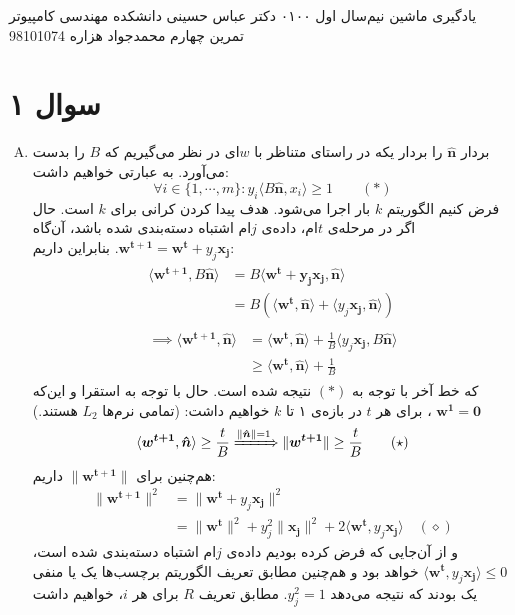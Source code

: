 \documentclass[a4paper, 12pt]{article}
\begin{document}
\handout
{یادگیری ماشین}
{نیم‌سال اول ۰۱\lr{-}۰۰}
{دکتر عباس حسینی}
{دانشکده مهندسی کامپیوتر}
{تمرین چهارم}
{محمد‌جواد هزاره}
{98101074}
\noindent
\\ [-6em]
\section*{سوال ۱}
\begin{enumerate}[A)]
	\item
	بردار $\bm{\hat{n}}$ را بردار یکه در راستای متناظر با $w$ای در نظر می‌گیریم که $B$ را بدست می‌آورد. به عبارتی خواهیم داشت:
	\[
	\forall i \in \{1, \cdots, m\}: y_i\langle B\bm{\hat{n}}, x_i\rangle \ge 1 \qquad (\ast)
	\]
	فرض کنیم الگوریتم $k$ بار اجرا می‌شود. هدف پیدا کردن کرانی برای $k$ است. حال اگر در مرحله‌ی $t$ام، داده‌ی $j$ام اشتباه دسته‌بندی شده باشد، آن‌گاه
	$\bm{w^{t+1}} = \bm{w^{t}} + y_j\bm{x_j}$.
	بنابراین داریم:
	\[
	\begin{aligned}
	\begin{aligned}
		\langle\bm{w^{t+1}}, B\bm{\hat{n}}\rangle &= B \langle\bm{w^t + y_j\bm{x_j}}, \bm{\hat{n}}\rangle \\
			&= B \left(\langle\bm{w^t}, \bm{\hat{n}}\rangle + \langle y_j\bm{x_j}, \bm{\hat{n}}\rangle\right)
	\end{aligned} \\[1.5em]
	\begin{aligned}
		\implies\langle\bm{w^{t+1}}, \bm{\hat{n}} \rangle &= \langle\bm{w^t}, \bm{\hat{n}}\rangle + \frac{1}{B} \langle y_j\bm{x_j}, B\bm{\hat{n}}\rangle \\
		&\ge \langle\bm{w^t}, \bm{\hat{n}}\rangle + \frac{1}{B}
	\end{aligned}
	\end{aligned}
	\]
	که خط آخر با توجه به $(\ast)$ نتیجه شده است. حال با توجه به استقرا و این‌که 
	$\bm{w^1} = \bm{0}$
	، برای هر $t$ در بازه‌ی ۱ تا $k$ خواهیم داشت: (تمامی نرم‌ها $L_2$ هستند.)
	\[
	\langle\bm{w^{t+1}}, \bm{\hat{n}}\rangle \ge \frac{t}{B} \xRightarrow{\|\bm{\hat{n}}\| = 1} \|\bm{w^{t+1}}\| \ge \frac{t}{B} \qquad (\star)
	\]
	هم‌چنین برای
	$\|\bm{w^{t+1}}\|$
	داریم:
	\[
	\begin{aligned}
		\|\bm{w^{t+1}}\|^2 &= \|\bm{w^t} + y_j\bm{x_j}\|^2 \\
			&= \|\bm{w^t}\|^2 + y_j^2\|\bm{x_j}\|^2 + 2\langle\bm{w^t}, y_j\bm{x_j}\rangle \quad (\diamond)
	\end{aligned}
	\]
	و از آن‌جایی که فرض کرده بودیم داده‌ی $j$ام اشتباه دسته‌بندی شده است،
	$\langle\bm{w^{t}}, y_j\bm{x_j}\rangle \le 0$
	خواهد بود و هم‌چنین مطابق تعریف الگوریتم برچسب‌ها یک یا منفی یک بودند که نتیجه می‌دهد $y_j^2 = 1$. مطابق تعریف $R$ برای هر $i$، خواهیم داشت

\end{enumerate}
\end{document}
